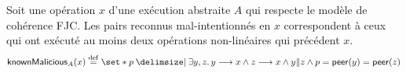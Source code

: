 %
%

\begin{definition}\label{def:known-malicious}
  Soit une opération $x$ d'une exécution abstraite $A$ qui respecte le modèle de cohérence \acl{FJC}.
  Les pairs reconnus mal-intentionnés en $x$ correspondent à ceux qui ont exécuté au moins deux opérations non-linéaires qui précédent $x$.
  \begin{equation*}
      \trm{knownMalicious}_A(x) \defeq \set*{p \given \exists y, z \qsep y \pre x \land z \pre x \land y \concur z \land p = \trm{peer}(y) = \trm{peer}(z)}
  \end{equation*}
\end{definition}

